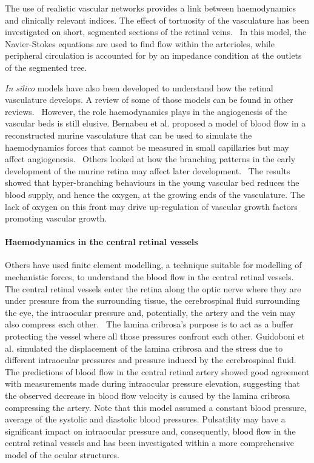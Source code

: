 \documentclass{article}
\begin{document}
The use of realistic vascular networks provides a link between haemodynamics and clinically relevant indices.
The effect of tortuosity of the vasculature has been investigated on short, segmented sections of the retinal veins.~\cite{Malek_2014}
In this model, the Navier-Stokes equations are used to find flow within the arterioles, while peripheral circulation is accounted for by an impedance condition at the outlets of the segmented tree.

\textit{In silico} models have also been developed to understand how the retinal vasculature develops.
A review of some of those models can be found in other reviews.~\cite{Arciero_2019,Roberts_2016}
However, the role haemodynamics plays in the angiogenesis of the vascular beds is still elusive.
Bernabeu et al. proposed a model of blood flow in a reconstructed murine vasculature that can be used to simulate the haemodynamics forces that cannot be measured in small capillaries but may affect angiogenesis.~\cite{Bernabeu_2014}
Others looked at how the branching patterns in the early development of the murine retina may affect later development.~\cite{Mirzapour_Shafiyi_2021}
The results showed that hyper-branching behaviours in the young vascular bed reduces the blood supply, and hence the oxygen, at the growing ends of the vasculature.
The lack of oxygen on this front may drive up-regulation of vascular growth factors promoting vascular growth.


\paragraph*{Haemodynamics in the central retinal vessels}

Others have used finite element modelling, a technique suitable for modelling of mechanistic forces, to understand the blood flow in the central retinal vessels.~\cite{Guidoboni_2014,Jin_2020}
The central retinal vessels enter the retina along the optic nerve where they are under pressure from the surrounding tissue, the cerebrospinal fluid surrounding the eye, the intraocular pressure and, potentially, the artery and the vein may also compress each other.~\cite{Nickells_2012}
The lamina cribrosa's purpose is to act as a buffer protecting the vessel where all those pressures confront each other.
Guidoboni et al. simulated the displacement of the lamina cribrosa and the stress due to different intraocular pressures and pressure induced by the cerebrospinal fluid.~\cite{Guidoboni_2014}
The predictions of blood flow in the central retinal artery showed good agreement with measurements made during intraocular pressure elevation, suggesting that the observed decrease in blood flow velocity is caused by the lamina cribrosa compressing the artery.
Note that this model assumed a constant blood pressure, average of the systolic and diastolic blood pressures.
Pulsatility may have a significant impact on intraocular pressure and, consequently, blood flow in the central retinal vessels and has been investigated within a more comprehensive model of the ocular structures.~\cite{Jin_2020}
\end{document}
